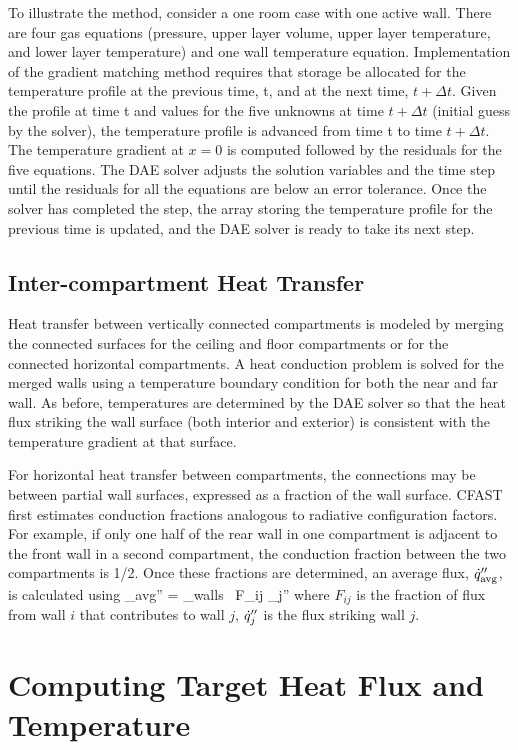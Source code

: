 To illustrate the method, consider a one room case with one active wall.  There are four gas equations (pressure, upper layer volume, upper layer temperature, and lower layer temperature) and one wall temperature equation.  Implementation of the gradient matching method requires that storage be allocated for the temperature profile at the previous time, t, and at the next time, $t + \Delta t$.  Given the profile at time t and values for the five unknowns at time $t + \Delta t$ (initial guess by the solver), the temperature profile is advanced from time t to time $t + \Delta t$.  The temperature gradient at $x = 0$ is computed followed by the residuals for the five equations.  The DAE solver adjusts the solution variables and the time step until the residuals for all the equations are below an error tolerance.  Once the solver has completed the step, the array storing the temperature profile for the previous time is updated, and the DAE solver is ready to take its next step.

\subsection{Inter-compartment Heat Transfer}

Heat transfer between vertically connected compartments is modeled by merging the connected surfaces for the ceiling and floor compartments or for the connected horizontal compartments.  A heat conduction problem is solved for the merged walls using a temperature boundary condition for both the near and far wall.  As before, temperatures are determined by the DAE solver so that the heat flux striking the wall surface (both interior and exterior) is consistent with the temperature gradient at that surface.

For horizontal heat transfer between compartments, the connections may be between partial wall surfaces, expressed as a fraction of the wall surface. CFAST first estimates conduction fractions analogous to radiative configuration factors.    For example, if only one half of the rear wall in one compartment is adjacent to the front wall in a second compartment, the conduction fraction between the two compartments is 1/2.   Once these fractions are determined, an average flux, $\dot{q}_{\rm avg}''$, is calculated using
\be 
   \dq_{\rm avg}'' = \sum_{\rm walls} \, F_{ij} \dq_j'' 
\ee
where $F_{ij}$ is the fraction of flux from wall $i$ that contributes to wall $j$, $\dot{q}_j''$ is the flux striking wall $j$.

\section{Computing Target Heat Flux and Temperature}

